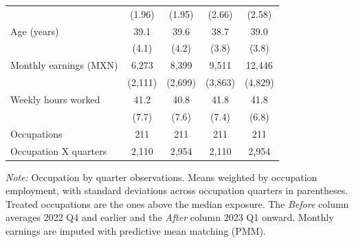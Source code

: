 \begin{table}[H]
\begin{threeparttable}
\begin{tabular}[t]{lcccc}
                                     & (1.96)                      & (1.95)                      & (2.66)      & (2.58)      \\
      \addlinespace[3pt]
      Age (years)                    & 39.1                        & 39.6                        & 38.7        & 39.0        \\
                                     & (4.1)                       & (4.2)                       & (3.8)       & (3.8)       \\
      \addlinespace[3pt]
      Monthly earnings (MXN)         & 6,273                       & 8,399                       & 9,511       & 12,446      \\
                                     & (2,111)                     & (2,699)                     & (3,863)     & (4,829)     \\
      \addlinespace[3pt]
      Weekly hours worked            & 41.2                        & 40.8                        & 41.8        & 41.8        \\
                                     & (7.7)                       & (7.6)                       & (7.4)       & (6.8)       \\
      \midrule
      Occupations                    & 211                         & 211                         & 211         & 211         \\
      Occupation X quarters          & 2,110                       & 2,954                       & 2,110       & 2,954       \\
      \bottomrule
    \end{tabular}
    \begin{tablenotes}
      \item \textit{Note: } Occupation by quarter observations. Means weighted by occupation employment, with standard deviations across occupation quarters in parentheses. Treated occupations are the ones above the median exposure. The \textit{Before} column averages 2022 Q4 and earlier and the \textit{After} column 2023 Q1 onward. Monthly earnings are imputed with predictive mean matching (PMM).
    \end{tablenotes}
  \end{threeparttable}
\end{table}


